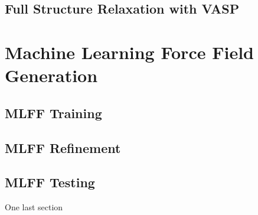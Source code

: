 \subsection{Full Structure Relaxation with VASP}



\section{Machine Learning Force Field Generation}



\subsection{MLFF Training}
\subsection{MLFF Refinement}
\subsection{MLFF Testing}

One last section 

